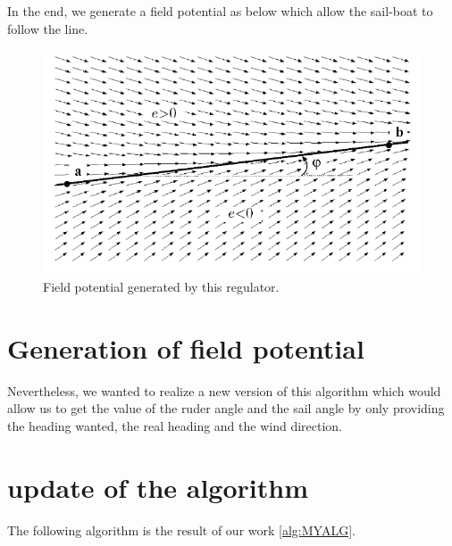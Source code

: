 In the end, we generate a field potential as below which allow the sail-boat to follow the line.

\begin{figure}[H]
\centering
    \includegraphics[scale=0.5,angle=0]{Images/FieldVector.png}
    \caption{Field potential generated by this regulator.}
    \label{fig:FieldVector}
\end{figure}


\chapter{Generation of field potential}


Nevertheless, we wanted to realize a new version of this algorithm which would allow us to get the value of the ruder angle and the sail angle by only providing the heading wanted, the real heading and the wind direction. 




\chapter{update of the algorithm}

The following algorithm is the result of our work \ref{alg:MYALG}.


